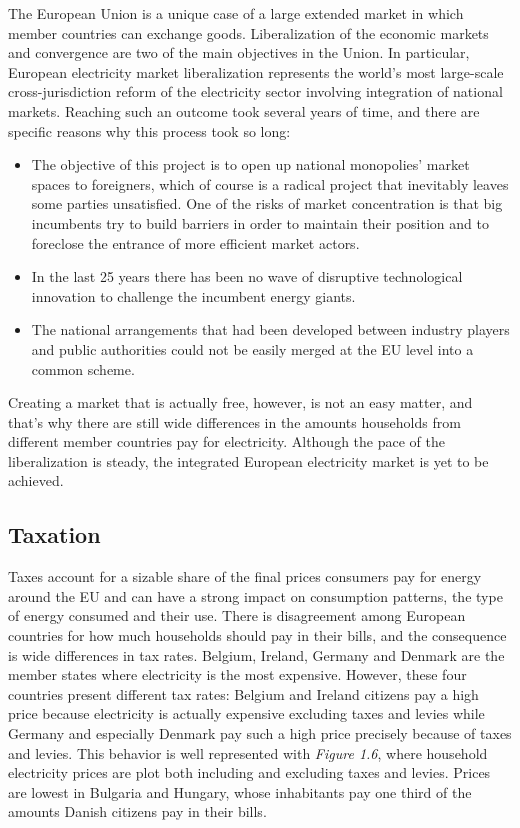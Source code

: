 \documentclass{book}
\begin{document}
The European Union is a unique case of a large extended market in which member countries can exchange goods.  Liberalization of the economic markets and convergence are two of the main objectives in the Union. In particular, European electricity market liberalization represents the world's most large-scale cross-jurisdiction reform of the electricity sector involving integration of national markets. Reaching such an outcome took several years of time, and there are specific reasons why this process took so long:

\begin{itemize}

\item The objective of this project is to open up national monopolies’ market spaces to foreigners, which of course is a radical
project that inevitably leaves some parties unsatisfied.  One of the risks of market concentration is that big incumbents try to build
barriers in order to maintain their position and to foreclose the entrance of more efficient market actors. \cite{ringel2003liberalising}

\item In the last 25 years there has been no wave of disruptive technological innovation to challenge the incumbent energy
giants.

\item The national arrangements that had been developed between industry players and public authorities could not be easily merged at the EU level into a common scheme.
\end{itemize}

Creating a market that is actually free, however, is not an easy matter, and that's why there are still wide differences in the amounts households from different member countries pay for electricity. Although the pace of the liberalization is steady, the integrated European electricity market is yet to be achieved. \\

\subsection{Taxation}

Taxes account for a sizable share of the final prices consumers pay for energy around the EU and can have a strong impact on consumption patterns, the type of energy consumed and their use. There is disagreement among European countries for how much households should pay in their bills, and the consequence is wide differences in tax rates. Belgium, Ireland, Germany and Denmark are the member states where electricity is the most expensive. However, these four countries present different tax rates: Belgium and Ireland citizens pay a high price because electricity is actually expensive excluding taxes and levies while Germany and especially Denmark pay such a high price precisely because of taxes and levies. This behavior is well represented with \textit{Figure 1.6}, where household electricity prices are plot both including and excluding taxes and levies. Prices are lowest in Bulgaria and Hungary, whose inhabitants pay one third of the amounts Danish citizens pay in their bills. 
\end{document}
